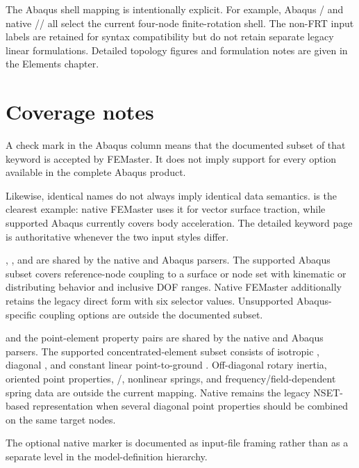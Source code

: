 \normalsize

The Abaqus shell mapping is intentionally explicit. For example, Abaqus / and native // all select the current four-node finite-rotation shell. The non-FRT input labels are retained for syntax compatibility but do not retain separate legacy linear formulations. Detailed topology figures and formulation notes are given in the Elements chapter.

\section{Coverage notes}

A check mark in the Abaqus column means that the documented subset of that keyword is accepted by FEMaster. It does not imply support for every option available in the complete Abaqus product.

Likewise, identical names do not always imply identical data semantics.  is the clearest example: native FEMaster uses it for vector surface traction, while supported Abaqus  currently covers  body acceleration. The detailed keyword page is authoritative whenever the two input styles differ.

, , and  are shared by the native and Abaqus parsers. The supported Abaqus subset covers reference-node coupling to a surface or node set with kinematic or distributing behavior and inclusive DOF ranges. Native FEMaster additionally retains the legacy direct  form with six selector values. Unsupported Abaqus-specific coupling options are outside the documented subset.

 and the point-element property pairs are shared by the native and Abaqus parsers. The supported concentrated-element subset consists of isotropic , diagonal , and constant linear point-to-ground . Off-diagonal rotary inertia, oriented point properties, /, nonlinear springs, and frequency/field-dependent spring data are outside the current mapping. Native  remains the legacy NSET-based representation when several diagonal point properties should be combined on the same target nodes.

The optional native  marker is documented as input-file framing rather than as a separate level in the model-definition hierarchy.

